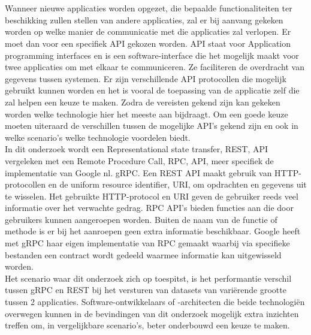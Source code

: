 
\chapter{}%
\label{ch:inleiding}

Wanneer nieuwe applicaties worden opgezet, die bepaalde functionaliteiten ter beschikking zullen stellen van andere applicaties, zal er bij aanvang gekeken worden
op welke manier de communicatie met die applicaties zal verlopen. Er moet dan voor een specifiek API gekozen worden.
API staat voor Application programming interfaces en is een software-interface die het mogelijk maakt voor twee
applicaties om met elkaar te communiceren. Ze faciliteren de overdracht van gegevens tussen systemen. Er zijn verschillende API protocollen die mogelijk gebruikt kunnen worden
en het is vooral de toepassing van de applicatie zelf die zal helpen een keuze te maken. Zodra de vereisten gekend zijn kan gekeken worden welke technologie hier
het meeste aan bijdraagt. Om een goede keuze moeten uiteraard de verschillen tussen de mogelijke API's gekend zijn en ook in welke scenario's welke technologie voordelen biedt.\\

In dit onderzoek wordt een Representational state transfer, REST, API vergeleken met een Remote Procedure Call, RPC, API, meer specifiek de
implementatie van Google nl. gRPC. Een REST API maakt gebruik van HTTP-protocollen en de uniform resource identifier, URI, om opdrachten en gegevens uit te wisselen.
Het gebruikte HTTP-protocol en URI geven de gebruiker reeds veel informatie over het verwachte gedrag.
RPC API's bieden functies aan die door gebruikers kunnen aangeroepen worden.
Buiten de naam van de functie of methode is er bij het aanroepen geen extra informatie beschikbaar.
Google heeft met gRPC haar eigen implementatie van RPC gemaakt waarbij via specifieke bestanden een contract wordt gedeeld waarmee informatie kan uitgewisseld worden.\\

Het scenario waar dit onderzoek zich op toespitst, is het performantie verschil tussen gRPC en REST bij het versturen van datasets van variërende grootte tussen 2 applicaties.
Software-ontwikkelaars of -architecten die beide technologiën overwegen kunnen in de bevindingen van dit onderzoek mogelijk extra inzichten treffen
om, in vergelijkbare scenario's, beter onderbouwd een keuze te maken.\\

